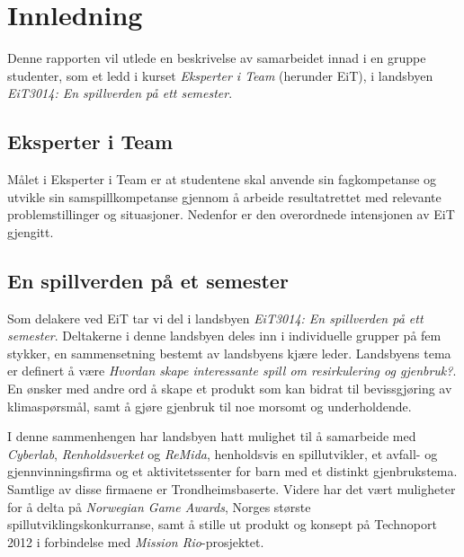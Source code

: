 \section{Innledning}
Denne rapporten vil utlede en beskrivelse av samarbeidet innad i en gruppe studenter, som et ledd i kurset \emph{Eksperter i Team} (herunder EiT), i landsbyen \emph{EiT3014: En spillverden på ett semester}.

	\subsection{Eksperter i Team}
	Målet i Eksperter i Team er at studentene skal anvende sin fagkompetanse og utvikle sin samspillkompetanse gjennom å arbeide resultatrettet med relevante problemstillinger og situasjoner. Nedenfor er den overordnede intensjonen av EiT gjengitt.


	\subsection{En spillverden på et semester}
	Som delakere ved EiT tar vi del i landsbyen \emph{EiT3014: En spillverden på ett semester}. Deltakerne i denne landsbyen deles inn i individuelle grupper på fem stykker, en sammensetning bestemt av landsbyens kjære leder. Landsbyens tema er definert å være \emph{Hvordan skape interessante spill om resirkulering og gjenbruk?}. En ønsker med andre ord å skape et produkt som kan bidrat til bevissgjøring av klimaspørsmål, samt å gjøre gjenbruk til noe morsomt og underholdende.

	I denne sammenhengen har landsbyen hatt mulighet til å samarbeide med \emph{Cyberlab}, \emph{Renholdsverket} og \emph{ReMida}, henholdsvis en spillutvikler, et avfall- og gjennvinningsfirma og et aktivitetssenter for barn med et distinkt gjenbrukstema. Samtlige av disse firmaene er Trondheimsbaserte. Videre har det vært muligheter for å delta på \emph{Norwegian Game Awards}, Norges største spillutviklingskonkurranse, samt å stille ut produkt og konsept på Technoport 2012 i forbindelse med \emph{Mission Rio}-prosjektet.


